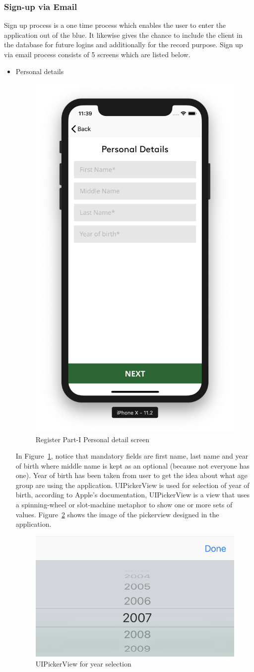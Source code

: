 \subsubsection{Sign-up via Email}

Sign up process is a one time process which enables the user to enter the application out of the blue. It likewise gives the chance to include the client in the database for future logins and additionally for the record purpose. Sign up via email process consists of 5 screens which are listed below.

\begin{itemize}

    \item Personal details
    
    \begin{figure}[H]
            \centering
            \includegraphics[width=0.25\linewidth]{figures/ch4/register_personal.png}
            \caption{\label{fig:register_personal_ch4} Register Part-I Personal detail screen}
    \end{figure}
    
    In Figure~\ref{fig:register_personal_ch4}, notice that mandatory fields are first name, last name and year of birth where middle name is kept as an optional (because not everyone has one). Year of birth has been taken from user to get the idea about what age group are using the application. UIPickerView is used for selection of year of birth, according to Apple's documentation, UIPickerView is a view that uses a spinning-wheel or slot-machine metaphor to show one or more sets of values. Figure~\ref{fig:pickerview} shows the image of the pickerview designed in the application.
    
    \begin{figure}[H]
            \centering
            \includegraphics[width=0.25\linewidth]{figures/ch4/pickerview.png}
            \caption{\label{fig:pickerview} UIPickerView for year selection}
    \end{figure}
    

\end{itemize}
